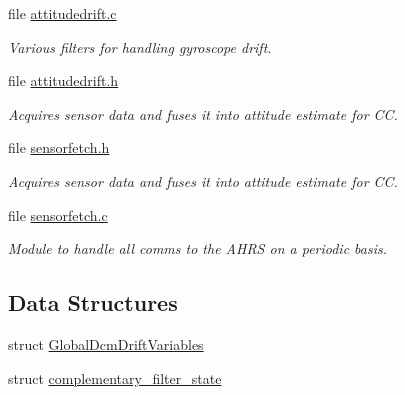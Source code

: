 \begin{DoxyCompactItemize}
file \hyperlink{attitudedrift_8c}{attitudedrift.\-c}
\begin{DoxyCompactList}\small\item\em Various filters for handling gyroscope drift. \end{DoxyCompactList}\item 
file \hyperlink{attitudedrift_8h}{attitudedrift.\-h}
\begin{DoxyCompactList}\small\item\em Acquires sensor data and fuses it into attitude estimate for C\-C. \end{DoxyCompactList}\item 
file \hyperlink{sensorfetch_8h}{sensorfetch.\-h}
\begin{DoxyCompactList}\small\item\em Acquires sensor data and fuses it into attitude estimate for C\-C. \end{DoxyCompactList}\item 
file \hyperlink{sensorfetch_8c}{sensorfetch.\-c}
\begin{DoxyCompactList}\small\item\em Module to handle all comms to the A\-H\-R\-S on a periodic basis. \end{DoxyCompactList}\end{DoxyCompactItemize}
\subsection*{Data Structures}
\begin{DoxyCompactItemize}
\item 
struct \hyperlink{struct_global_dcm_drift_variables}{Global\-Dcm\-Drift\-Variables}
\item 
struct \hyperlink{structcomplementary__filter__state}{complementary\-\_\-filter\-\_\-state}
\end{DoxyCompactItemize}
